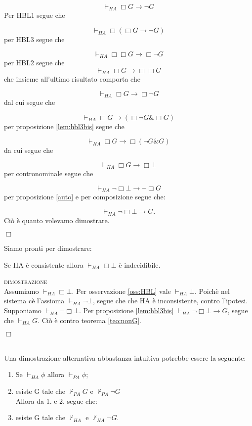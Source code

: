 	$$\vdash_{HA}\Box G \rightarrow \neg G$$
	Per HBL1 segue che
	
	$$\vdash_{HA}\Box(\Box G \rightarrow\neg G)$$
	per HBL3 segue che

	$$\vdash_{HA}\Box\Box G \rightarrow \Box\neg G$$
	per HBL2 segue che
	$$\vdash_{HA} \Box G \rightarrow \Box\Box G$$
	che insieme all'ultimo risultato comporta che

	$$\vdash_{HA} \Box G \rightarrow \Box\neg G$$
	dal cui segue che

	$$\vdash_{HA} \Box G \rightarrow (\Box\neg G \& \Box G)$$
	per proposizione \ref{lem:hbl3bis} segue che
	
	$$\vdash_{HA} \Box G \rightarrow \Box(\neg G \& G)$$
	da cui segue che
	
	$$\vdash_{HA} \Box G \rightarrow \Box\bot$$
	per contronominale segue che
	
	$$\vdash_{HA} \neg\Box\bot \rightarrow \neg\Box G$$
	per proposizione \ref{auto} e per composizione segue che:

	$$\vdash_{HA} \neg\Box\bot \rightarrow G.$$
	Ci\`o \`e quanto volevamo dimostrare.
	\begin{flushright}$\Box$\end{flushright}

	Siamo pronti per dimostrare:

	\begin{thm}
	\label{teo:inc1}
	Se HA \`e consistente allora $\vdash_{HA}\Box\bot$ \`e indecidibile.
	\end{thm}
	
	\textsc{dimostrazione}\\
 	Assumiamo $\vdash_{HA}\Box\bot$. Per osservazione
 	\ref{oss:HBL} vale $\vdash_{HA}\bot$.
	Poich\`e nel sistema c\`e l'assioma $\vdash_{HA}\neg\bot$,
	segue che che HA \`e inconsistente, contro l'ipotesi.
 	Supponiamo $\vdash_{HA}\neg\Box\bot$.
	Per proposizione \ref{lem:hbl3bis} $\vdash_{HA}\neg\Box\bot\rightarrow G$,
	segue che $\vdash_{HA} G$. Ci\`o \`e contro teorema \ref{teo:nonG}.
	\begin{flushright}$\Box$\end{flushright}
	\\
	Una dimostrazione alternativa abbastanza intuitiva potrebbe essere la seguente:
	
	\begin{thm} \qquad
	\begin{enumerate}
	\item Se $\vdash_{HA}\phi$ allora $\vdash_{PA}\phi$;
	\item esiste G tale che $\nvdash_{PA} G$ e $\nvdash_{PA} \neg G$ \\
	Allora da 1. e 2. segue che:
	\item esiste G tale che $\nvdash_{HA}$ e $\nvdash_{HA} \neg G$.
	\end{enumerate}
	\end{thm}
	

